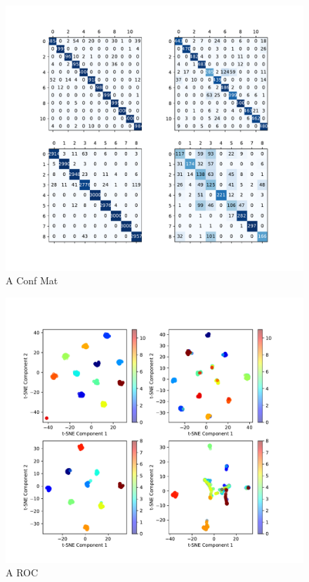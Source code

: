 \documentclass{article}
\begin{document}
	\begin{figure}[htbp]
		\centering
		\includegraphics[width=0.8\linewidth]{Figs/abnormity_confusion_matrix.pdf}
		\caption{A Conf Mat}
		\vspace{0.3cm}
		\label{fig:A_conf_mat}
	\end{figure}
	
	\begin{figure}[htbp]
		\centering
		\includegraphics[width=\linewidth]{Figs/abnormity_tSNE.pdf}
		\caption{A ROC}
		\vspace{0.3cm}
		\label{fig:A_tSNE}
	\end{figure}
	
\end{document}
